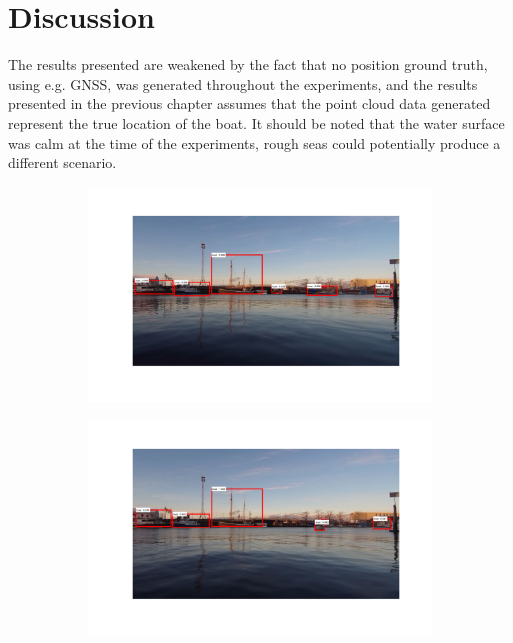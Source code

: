 
\chapter{Discussion}
The results presented are weakened by the fact that no position ground truth, using e.g. GNSS, was generated throughout the experiments, and the results presented in the previous chapter assumes that the point cloud data generated represent the true location of the boat.  It should be noted that the water surface was calm at the time of the experiments, rough seas could potentially produce a different scenario.

\begin{figure}
	\centering
	\begin{subfigure}[t]{.5\textwidth}
	\centering
	\includegraphics[width=\linewidth]{fig/discussion/ex1_1.png}
	\end{subfigure}%
	\begin{subfigure}[t]{.5\textwidth}
	\centering
	\includegraphics[width=\linewidth]{fig/discussion/ex2_1.png}
	\end{subfigure}


\end{figure}

